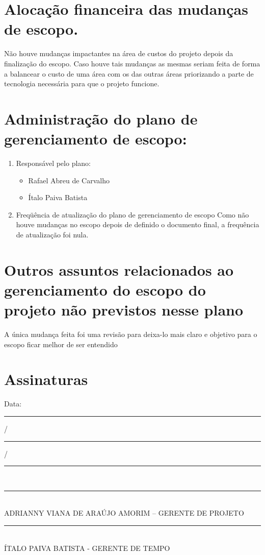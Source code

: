 \documentclass[12pt,openright,oneside,a4paper,brazil]{abntex2}
\begin{document}
\section{Alocação financeira das mudanças de escopo.}
Não houve mudanças impactantes na área de custos do projeto depois da finalização do escopo. Caso houve tais mudanças as mesmas seriam feita de forma a balancear o custo de uma área com os das outras áreas priorizando a parte de tecnologia necessária para que o projeto funcione.

\section{Administração do plano de gerenciamento de escopo:}
\begin{enumerate}

\item Responsável pelo plano:
\begin{itemize}
\item Rafael Abreu de Carvalho
\item Ítalo Paiva Batista

\end{itemize}

\item Freqüência de atualização do plano de gerenciamento de escopo
Como não houve mudanças no escopo depois de definido o documento final, a frequência de atualização foi nula.
\end{enumerate}

\section{Outros assuntos relacionados ao gerenciamento do escopo do projeto não previstos nesse plano}
A única mudança feita foi uma revisão para deixa-lo mais claro e objetivo para o escopo ficar melhor de ser entendido

\section{Assinaturas}
\begin{center}
Data: \rule{0.5cm}{0.1mm}/\rule{0.5cm}{0.1mm}/\rule{1cm}{0.1mm}     \\
\rule{13cm}{0.1mm}\\
ADRIANNY VIANA DE ARAÚJO AMORIM – GERENTE DE PROJETO\\
\rule{13cm}{0.1mm}\\
ÍTALO PAIVA BATISTA - GERENTE DE TEMPO

\end{center}
\end{document}
